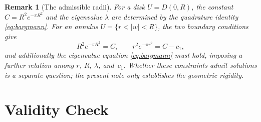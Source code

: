 \documentclass[11pt]{article}
\newtheorem{remark}[theorem]{Remark}
\newcommand{\1}{\mathbf 1}
\begin{document}
\begin{remark}[The admissible radii]
For a disk \(U=D(0,R)\), the constant \(C=R^2e^{-\pi R^2}\) and the eigenvalue
\(\lambda\) are determined by the quadrature identity \eqref{eq:bargmann}. For an annulus
\(U=\{r<|w|<R\}\), the two boundary conditions give
\[
R^2e^{-\pi R^2}=C,
\qquad
r^2e^{-\pi r^2}=C-c_1,
\]
and additionally the eigenvalue equation \eqref{eq:bargmann} must hold, imposing a
further relation among \(r\), \(R\), \(\lambda\), and~\(c_1\). Whether these constraints
admit solutions is a separate question; the present note only establishes the geometric
rigidity.
\end{remark}

\section{Validity Check}
\end{document}
